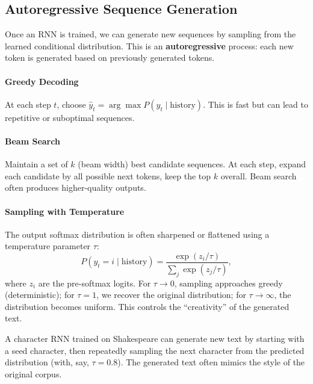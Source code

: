\documentclass{tufte-handout}
\begin{document}
\subsection{Autoregressive Sequence Generation}

Once an RNN is trained, we can generate new sequences by sampling from the learned conditional distribution. This is an \textbf{autoregressive} process: each new token is generated based on previously generated tokens.

\paragraph{Greedy Decoding}
At each step $t$, choose $\hat{y}_t = \arg\max P(y_t \mid \text{history})$. This is fast but can lead to repetitive or suboptimal sequences.

\paragraph{Beam Search}
Maintain a set of $k$ (beam width) best candidate sequences. At each step, expand each candidate by all possible next tokens, keep the top $k$ overall. Beam search often produces higher-quality outputs.

\paragraph{Sampling with Temperature}
The output softmax distribution is often sharpened or flattened using a temperature parameter $\tau$:
\[
P(y_t = i \mid \text{history}) = \frac{\exp(z_i / \tau)}{\sum_j \exp(z_j / \tau)},
\]
where $z_i$ are the pre-softmax logits. For $\tau \to 0$, sampling approaches greedy (deterministic); for $\tau = 1$, we recover the original distribution; for $\tau \to \infty$, the distribution becomes uniform. This controls the “creativity” of the generated text.

\begin{exmp}
    A character RNN trained on Shakespeare can generate new text by starting with a seed character, then repeatedly sampling the next character from the predicted distribution (with, say, $\tau = 0.8$). The generated text often mimics the style of the original corpus.
\end{exmp}

\begin{marginfigure}
\centering
{}
\caption{As temperature $\tau$ increases, the sampling distribution becomes more uniform (higher entropy).}
\end{marginfigure}
\end{document}
